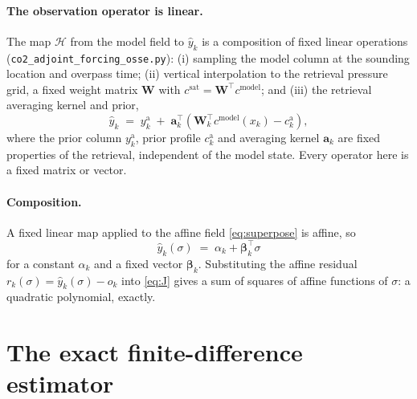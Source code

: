 \documentclass[12pt]{article}
\newcommand{\bm}[1]{\mathbf{#1}}
\newcommand{\Hop}{\mathcal{H}}
\begin{document}
\paragraph{The observation operator is linear.} The map $\Hop$ from the model
field to $\hat{y}_k$ is a composition of fixed linear operations
(\texttt{co2\_adjoint\_forcing\_osse.py}): (i) sampling the model column at the
sounding location and overpass time; (ii) vertical interpolation to the retrieval
pressure grid, a fixed weight matrix $\bm{W}$ with $c^{\mathrm{sat}} = \bm{W}^{\!\top}
c^{\mathrm{model}}$; and (iii) the retrieval averaging kernel and prior,
%
\begin{equation}
  \hat{y}_k \;=\; y^{\mathrm{a}}_k
  \;+\; \bm{a}_k^{\!\top}\!\left(\bm{W}_k^{\!\top} c^{\mathrm{model}}(x_k)
  - c^{\mathrm{a}}_k\right),
  \label{eq:Hop}
\end{equation}
%
where the prior column $y^{\mathrm{a}}_k$, prior profile $c^{\mathrm{a}}_k$ and
averaging kernel $\bm{a}_k$ are fixed properties of the retrieval, independent of
the model state. Every operator here is a fixed matrix or vector.

\paragraph{Composition.} A fixed linear map applied to the affine field
\eqref{eq:superpose} is affine, so
%
\begin{equation}
  \hat{y}_k(\sigma) \;=\; \alpha_k + \bm{\beta}_k^{\!\top}\sigma
  \label{eq:affine}
\end{equation}
%
for a constant $\alpha_k$ and a fixed vector $\bm{\beta}_k$. Substituting the
affine residual $r_k(\sigma) = \hat{y}_k(\sigma) - o_k$ into \eqref{eq:J} gives a
sum of squares of affine functions of $\sigma$: a quadratic polynomial, exactly.

\section{The exact finite-difference estimator}
\label{sec:fd}
\end{document}
